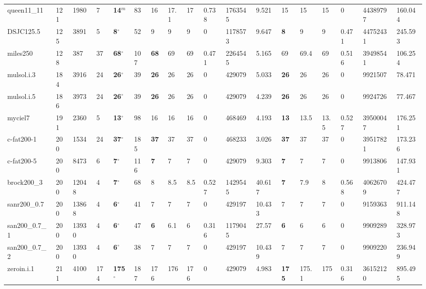 \begin{table}[h!]
{\begin{tabular}{llllllllllllllllll}
            queen11\_11 & 121 & 1980 & 7 & \textbf{14}$^{m}$ & 83 & 16 & 17.1 & 17 & 0.738 & 1763545 & 9.521 & 15 & 15 & 15 & 0 & 44389797 & 160.044 \\
            DSJC125.5 & 125 & 3891 & 5 & \textbf{8}$^{\circ}$ & 52 & 9 & 9 & 9 & 0 & 1178573 & 9.647 & \textbf{8} & 9 & 9 & 0.471 & 44752431 & 245.593 \\
            miles250 & 128 & 387 & 37 & \textbf{68}$^{\circ}$ & 107 & \textbf{68} & 69 & 69 & 0.471 & 2264545 & 5.165 & 69 & 69.4 & 69 & 0.516 & 39498541 & 106.254 \\
            mulsol.i.3 & 184 & 3916 & 24 & \textbf{26}$^{\circ}$ & 39 & \textbf{26} & 26 & 26 & 0 & 429079 & 5.033 & \textbf{26} & 26 & 26 & 0 & 9921507 & 78.471 \\
            mulsol.i.5 & 186 & 3973 & 24 & \textbf{26}$^{\circ}$ & 39 & \textbf{26} & 26 & 26 & 0 & 429079 & 4.239 & \textbf{26} & 26 & 26 & 0 & 9924726 & 77.467 \\
            myciel7 & 191 & 2360 & 5 & \textbf{13}$^{\circ}$ & 98 & 16 & 16 & 16 & 0 & 468469 & 4.193 & \textbf{13} & 13.5 & 13.5 & 0.527 & 39500047 & 176.251 \\
            c-fat200-1 & 200 & 1534 & 24 & \textbf{37}$^{\circ}$ & 185 & \textbf{37} & 37 & 37 & 0 & 468233 & 3.026 & \textbf{37} & 37 & 37 & 0 & 39517821 & 173.236 \\
            c-fat200-5 & 200 & 8473 & 6 & \textbf{7}$^{\circ}$ & 116 & \textbf{7} & 7 & 7 & 0 & 429079 & 9.303 & \textbf{7} & 7 & 7 & 0 & 9913806 & 147.931 \\
            brock200\_3 & 200 & 12048 & 4 & \textbf{7}$^{\circ}$ & 68 & 8 & 8.5 & 8.5 & 0.527 & 1429545 & 40.617 & \textbf{7} & 7.9 & 8 & 0.568 & 40626709 & 424.477 \\
            sanr200\_0.7 & 200 & 13868 & 4 & \textbf{6}$^{\circ}$ & 41 & 7 & 7 & 7 & 0 & 429197 & 10.433 & 7 & 7 & 7 & 0 & 9159363 & 911.148 \\
            san200\_0.7\_1 & 200 & 13930 & 4 & \textbf{6}$^{\circ}$ & 47 & \textbf{6} & 6.1 & 6 & 0.316 & 1179045 & 27.57 & \textbf{6} & 6 & 6 & 0 & 9909289 & 328.973 \\
            san200\_0.7\_2 & 200 & 13930 & 4 & \textbf{6}$^{\circ}$ & 38 & 7 & 7 & 7 & 0 & 429197 & 10.439 & 7 & 7 & 7 & 0 & 9909220 & 236.949 \\
            zeroin.i.1 & 211 & 4100 & 174 & \textbf{175}$^{\circ}$ & 187 & 176 & 176 & 176 & 0 & 429079 & 4.983 & \textbf{175} & 175.1 & 175 & 0.316 & 36152120 & 895.495 \\

\end{tabular}}
\end{table}
